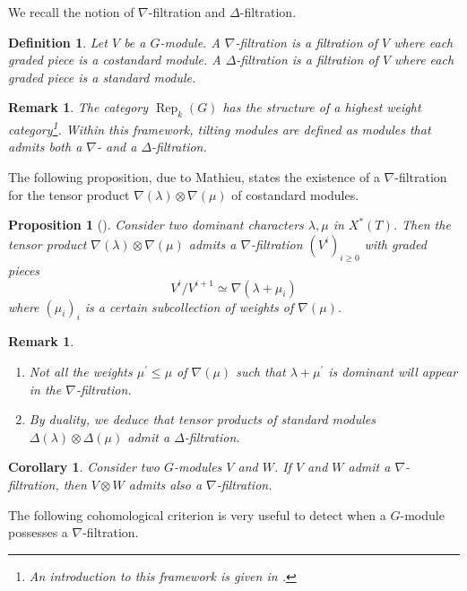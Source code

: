 \documentclass[11pt]{amsart}
\numberwithin{subsection}{section}
\numberwithin{figure}{section}
\numberwithin{table}{section}
\theoremstyle{1}
\newtheorem{proposition}[theorem]{Proposition}
\newtheorem{corollary}[theorem]{Corollary}
\newtheorem{definition}[theorem]{Definition}
\theoremstyle{2}
\newtheorem{rmrk}[theorem]{Remark}
\DeclareMathOperator{\Rep}{Rep}
\begin{document}
We recall the notion of $\nabla$-filtration and $\Delta$-filtration.
\begin{definition}\label{def6}
Let $V$ be a $G$-module. A $\nabla$-filtration is a filtration of $V$ where each graded piece is a costandard module. A $\Delta$-filtration is a filtration of $V$ where each graded piece is a standard module.
\end{definition}
\begin{rmrk}
The category $\Rep_k(G)$ has the structure of a highest weight category\footnote{An introduction to this framework is given in \cite{riche:tel-01431526}.}. Within this framework, tilting modules are defined as modules that admits both a $\nabla$- and a $\Delta$-filtration.
\end{rmrk}
\vspace{0.2cm}
The following proposition, due to Mathieu, states the existence of a $\nabla$-filtration for the tensor product $\nabla(\lambda) \otimes \nabla(\mu)$ of costandard modules.
\begin{proposition}[{\cite[Theorem 1]{MR1072820}}]\label{prop8_van}
Consider two dominant characters $\lambda, \mu$ in $X^*(T)$. Then the tensor product $\nabla(\lambda) \otimes \nabla(\mu)$ admits a $\nabla$-filtration $(V^i)_{i \geq 0}$ with graded pieces  
\begin{equation*}
V^i/V^{i+1} \simeq \nabla(\lambda+\mu_i)
\end{equation*}
where $(\mu_i)_{i}$ is a certain subcollection of weights of $\nabla(\mu)$.
\end{proposition}
\begin{rmrk}
\begin{enumerate}
\item Not all the weights $\mu^\prime \leq \mu$ of $\nabla(\mu)$ such that $\lambda + \mu^\prime$ is dominant will appear in the $\nabla$-filtration.
\item By duality, we deduce that tensor products of standard modules $\Delta(\lambda) \otimes \Delta(\mu)$ admit a $\Delta$-filtration.
\end{enumerate}
\end{rmrk}
\begin{corollary}\label{cor2}
Consider two $G$-modules $V$ and $W$. If $V$ and $W$ admit a $\nabla$-filtration, then $V \otimes W$ admits also a $\nabla$-filtration.
\end{corollary}
\vspace*{0.2cm}
The following cohomological criterion is very useful to detect when a $G$-module possesses a $\nabla$-filtration.
\end{document}
